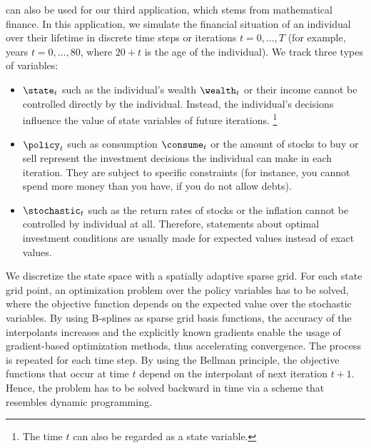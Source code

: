 
\label{chap:80finance}

can also be used for our third application,
which stems from mathematical finance.
In this application, we simulate the financial situation of an individual
over their lifetime in discrete time steps or iterations $t = 0, \dotsc, T$
(for example, years $t = 0, \dotsc, 80$, where $20+t$ is the age
of the individual).
We track three types of variables:

\begin{itemize}
  \item
   $\state_t$
  such as the individual's wealth $\wealth_t$ or their income
  cannot be controlled directly by the individual.
  Instead, the individual's decisions influence the value of
  state variables of future iterations.%
  \footnote{%
    The time $t$ can also be regarded as a state variable.%
  }
  
  \item
   $\policy_t$
  such as consumption $\consume_t$ or the amount of stocks to buy or sell
  represent the investment decisions the individual can make in
  each iteration.
  They are subject to specific constraints
  (for instance, you cannot spend more money than you have,
  if you do not allow debts).
  
  \item
   $\stochastic_t$
  such as the return rates of stocks or the inflation
  cannot be controlled by individual at all.
  Therefore, statements about optimal investment conditions
  are usually made for expected values instead of exact values.
\end{itemize}

We discretize the state space with a spatially adaptive sparse grid.
For each state grid point, an optimization problem over the policy
variables has to be solved, where the objective function depends
on the expected value over the stochastic variables.
By using B-splines as sparse grid basis functions,
the accuracy of the interpolants increases and
the explicitly known gradients enable the usage of
gradient-based optimization methods, thus accelerating convergence.
The process is repeated for each time step.
By using the Bellman principle, the objective functions that
occur at time $t$ depend on the interpolant of next iteration $t+1$.
Hence, the problem has to be solved backward in time
via a scheme that resembles dynamic programming.


